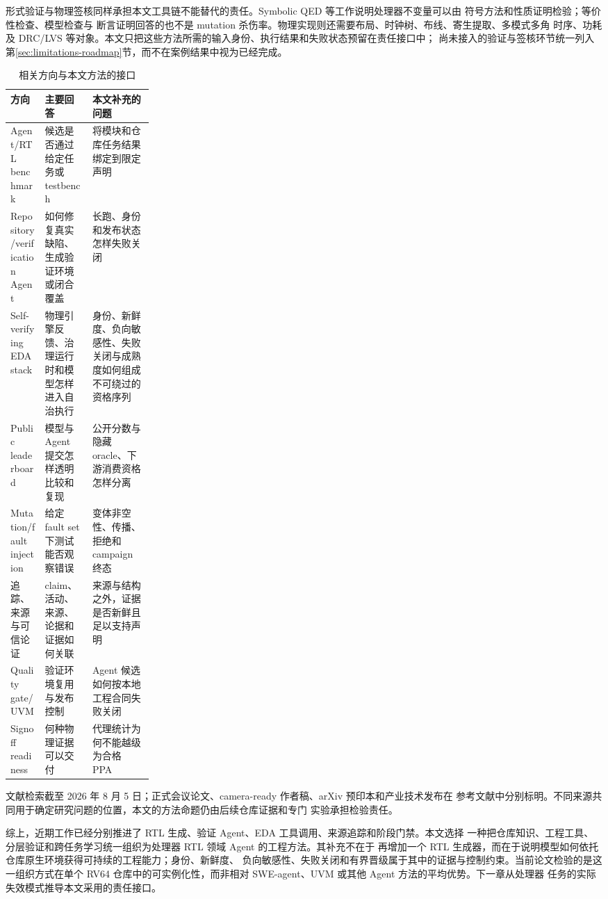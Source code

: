 \documentclass[UTF8,a4paper,zihao=-4,oneside]{ctexart}
\begin{document}
形式验证与物理签核同样承担本文工具链不能替代的责任。Symbolic QED 等工作说明处理器不变量可以由
符号方法和性质证明检验\cite{singh2019symbolicqed,chattopadhyay2023gqed}；等价性检查、模型检查与
断言证明回答的也不是 mutation 杀伤率。物理实现则还需要布局、时钟树、布线、寄生提取、多模式多角
时序、功耗及 DRC/LVS 等对象。本文只把这些方法所需的输入身份、执行结果和失败状态预留在责任接口中；
尚未接入的验证与签核环节统一列入第\ref{sec:limitations-roadmap}节，而不在案例结果中视为已经完成。

\begin{table}[H]
  \centering
  \small
  \caption{相关方向与本文方法的接口}
  \label{tab:related-gap}
  \begin{tabularx}{\linewidth}{@{}L{0.24\linewidth}YY@{}}
    \toprule
    方向 & 主要回答 & 本文补充的问题 \\
    \midrule
    Agent/RTL benchmark & 候选是否通过给定任务或 testbench & 将模块和仓库任务结果绑定到限定声明 \\
    Repository/verification Agent & 如何修复真实缺陷、生成验证环境或闭合覆盖 & 长跑、身份和发布状态怎样失败关闭 \\
    Self-verifying EDA stack & 物理引擎反馈、治理运行时和模型怎样进入自治执行 & 身份、新鲜度、负向敏感性、失败关闭与成熟度如何组成不可绕过的资格序列 \\
    Public leaderboard & 模型与 Agent 提交怎样透明比较和复现 & 公开分数与隐藏 oracle、下游消费资格怎样分离 \\
    Mutation/fault injection & 给定 fault set 下测试能否观察错误 & 变体非空性、传播、拒绝和 campaign 终态 \\
    追踪、来源与可信论证 & claim、活动、来源、论据和证据如何关联 & 来源与结构之外，证据是否新鲜且足以支持声明 \\
    Quality gate/UVM & 验证环境复用与发布控制 & Agent 候选如何按本地工程合同失败关闭 \\
    Signoff readiness & 何种物理证据可以交付 & 代理统计为何不能越级为合格 PPA \\
    \bottomrule
  \end{tabularx}
\end{table}

文献检索截至 2026 年 8 月 5 日；正式会议论文、camera-ready 作者稿、arXiv 预印本和产业技术发布在
参考文献中分别标明。不同来源共同用于确定研究问题的位置，本文的方法命题仍由后续仓库证据和专门
实验承担检验责任。

综上，近期工作已经分别推进了 RTL 生成、验证 Agent、EDA 工具调用、来源追踪和阶段门禁。本文选择
一种把仓库知识、工程工具、分层验证和跨任务学习统一组织为处理器 RTL 领域 Agent 的工程方法。其补充不在于
再增加一个 RTL 生成器，而在于说明模型如何依托仓库原生环境获得可持续的工程能力；身份、新鲜度、
负向敏感性、失败关闭和有界晋级属于其中的证据与控制约束。当前论文检验的是这一组织方式在单个
RV64 仓库中的可实例化性，而非相对 SWE-agent、UVM 或其他 Agent 方法的平均优势。下一章从处理器
任务的实际失效模式推导本文采用的责任接口。
\end{document}
